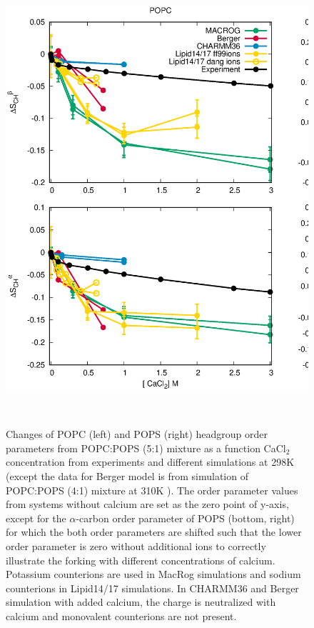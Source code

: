 \documentclass[aps,prl,superscriptaddress,twocolumn]{revtex4}
\begin{document}
\begin{figure}[ht]
  \centering
  \includegraphics[width=18cm]{../Figs/CHANGESwithCaClPS.eps}
  \caption{\label{changesWITHCaClPS}
    Changes of POPC (left) and POPS (right) headgroup order parameters from POPC:POPS (5:1) mixture
    as a function CaCl$_2$ concentration from experiments  and different simulations
    at 298K (except the data for Berger model is from simulation of POPC:POPS (4:1) mixture at 310K \cite{ollila07a,melcrova16}). 
    The order parameter values from systems without calcium are set as the zero point of y-axis,
    except for the $\alpha$-carbon order parameter of POPS (bottom, right) for which the both order parameters are shifted
    such that the lower order parameter is zero without additional ions to correctly illustrate
    the forking with different concentrations of calcium.
    Potassium counterions are used in MacRog simulations and sodium counterions in Lipid14/17 simulations.
    In CHARMM36 and Berger simulation with added calcium, the charge is neutralized with calcium and monovalent counterions are not present.
  }
   \\
\end{figure}
\end{document}
